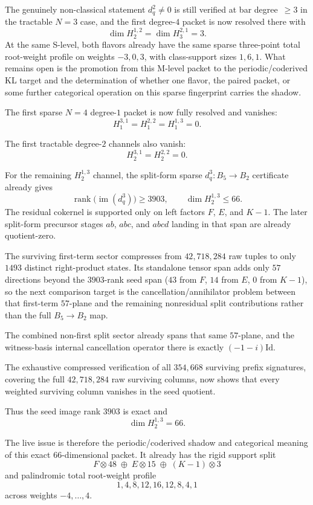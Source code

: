\begin{remark}
The genuinely non-classical statement $d_q^2\neq0$ is still verified at
bar degree~$\geq 3$ in the tractable $N=3$ case, and the first
degree-$4$ packet is now resolved there with
\[
\dim H^{1,2}_2
=
\dim H^{2,1}_3
=
3.
\]
At the same S-level, both flavors already have the same sparse
three-point total root-weight profile on weights $-3,0,3$, with
class-support sizes $1,6,1$.  What remains open is the promotion from
this M-level packet to the periodic/coderived KL target and the
determination of whether one flavor, the paired packet, or some further
categorical operation on this sparse fingerprint carries the shadow.

The first
sparse $N=4$ degree-$1$ packet is now fully resolved and vanishes:
\[
H^{3,1}_1 = H^{2,2}_1 = H^{1,3}_1 = 0.
\]

The first tractable degree-$2$ channels also vanish:
\[
H^{3,1}_2 = H^{2,2}_2 = 0.
\]

For the remaining $H^{1,3}_2$ channel, the split-form sparse
$d_q^3\colon B_5\to B_2$ certificate already gives
\[
\operatorname{rank}\bigl(\operatorname{im}(d_q^3)\bigr)\ge 3903,
\qquad
\dim H^{1,3}_2 \le 66.
\]
The residual cokernel is supported only on left factors
$F$, $E$, and $K-1$.  The later split-form precursor stages
$ab$, $abc$, and $abcd$ landing in that span are already quotient-zero.

The surviving first-term sector compresses from $42{,}718{,}284$ raw
tuples to only $1493$ distinct right-product states.  Its standalone
tensor span adds only $57$ directions beyond the $3903$-rank seed span
\textup{(}$43$ from $F$, $14$ from $E$, $0$ from $K-1$\textup{)}, so
the next comparison target is the cancellation/annihilator problem
between that first-term $57$-plane and
the remaining nonresidual split contributions rather than the full
$B_5 \to B_2$ map.

The combined non-first split sector already spans
that same $57$-plane, and the witness-basis internal cancellation
operator there is exactly $(-1-i)\mathrm{Id}$.

The exhaustive
compressed verification of all $354{,}668$ surviving prefix signatures,
covering the full $42{,}718{,}284$ raw surviving columns, now shows
that every weighted surviving column vanishes in the seed quotient.

Thus the seed image rank $3903$ is exact and
\[
\dim H^{1,3}_2 = 66.
\]

The live issue is therefore the periodic/coderived shadow and
categorical meaning of this exact $66$-dimensional packet.  It already
has the rigid support split
\[
F \otimes 48 \;\oplus\; E \otimes 15 \;\oplus\; (K-1)\otimes 3
\]
and palindromic total root-weight profile
\[
1,4,8,12,16,12,8,4,1
\]
across weights $-4,\dots,4$.


\end{remark}
